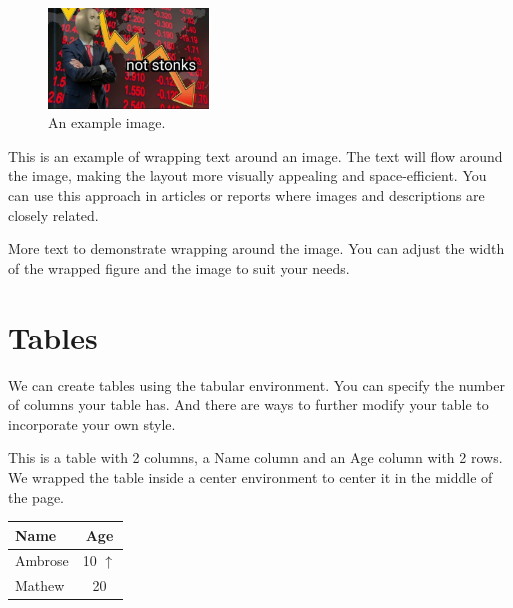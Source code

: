\documentclass{article}
\begin{document}

\begin{figure}
    \centering %
    \includegraphics[width=0.38\textwidth]{diagram-latex.jpeg} 
    \caption{An example image.}
    \label{fig:example}
\end{figure}

This is an example of wrapping text around an image. The text will flow around the image, making the layout more visually appealing and space-efficient. You can use this approach in articles or reports where images and descriptions are closely related.

More text to demonstrate wrapping around the image. You can adjust the width of the wrapped figure and the image to suit your needs.


\section{Tables}
We can create tables using the tabular environment. You can specify the number of columns your table has. And there are ways to further modify your table to incorporate your own style.


This is a table with 2 columns, a Name column and an Age column with 2 rows.
We wrapped the table inside a center environment to center it in the middle of the page.
\begin{center}
\begin{tabular}{|l|c|}
\hline
\textbf{Name} & \textbf{Age} \\ \hline
Ambrose & 10 \(\uparrow\)\\ \hline
Mathew & 20 \\ \hline
\end{tabular}
\end{center}
\end{document}
